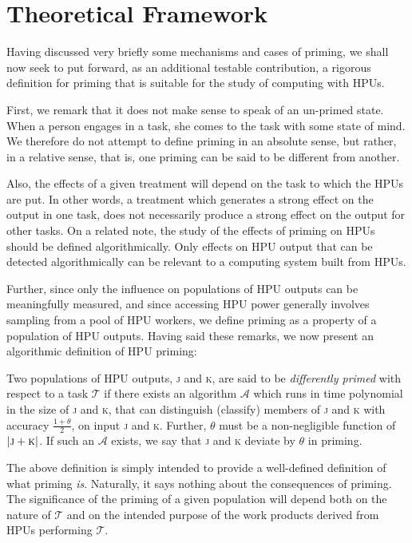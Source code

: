 \documentclass[letterpaper]{article}
\begin{document}
\section*{Theoretical Framework}
Having discussed very briefly some mechanisms and cases of priming, we shall 
now seek to put forward, as an additional testable contribution, a rigorous
definition for priming that is suitable for the study of computing with HPUs.

First, we remark that it does not make sense to speak of an un-primed 
state.  When a person engages in a task, she comes to the task with some 
state of mind.  We therefore do not attempt to define priming in an absolute
sense, but rather, in a relative sense, that is, one priming can be said to 
be different from another.

Also, the effects of a given treatment will depend on the task to which the 
HPUs are put.  In other words, a treatment which generates a strong effect on
the output in one task, does not necessarily produce a strong effect on the
output for other tasks.  On a related note, the study of the effects of priming
on HPUs should be defined algorithmically.  Only effects on HPU output that
can be detected algorithmically can be relevant to a computing system built 
from HPUs.

Further, since only the influence on populations of HPU outputs can be 
meaningfully measured, and since accessing HPU power generally involves 
sampling from a pool of HPU workers, we define priming as a property of a 
population of HPU outputs.  Having said these remarks, we now present an
algorithmic definition of HPU priming:

Two populations of HPU outputs, \textsc{j} and \textsc{k}, are said to be 
\textit{differently primed} with respect to a task $\mathcal{T}$ if there 
exists an algorithm $\mathcal{A}$ which runs in time polynomial in the size
of \textsc{j} and \textsc{k}, that can distinguish 
(classify) members of \textsc{j} and \textsc{k} with accuracy 
$\frac{1+\theta}{2}$, on input \textsc{j} and \textsc{k}.  Further, $\theta$
must be a non-negligible function of $|\textsc{j} + \textsc{k}|$.
If such an $\mathcal{A}$ exists, 
we say that \textsc{j} and \textsc{k} deviate by $\theta$ in priming.

The above definition is simply intended to provide a well-defined definition
of what priming \textit{is}.  Naturally, it says nothing about the consequences
of priming.  The significance of the priming of a given population will
depend both on the nature of $\mathcal{T}$ and on the intended purpose of 
the work products derived from HPUs performing $\mathcal{T}$.
\end{document}
